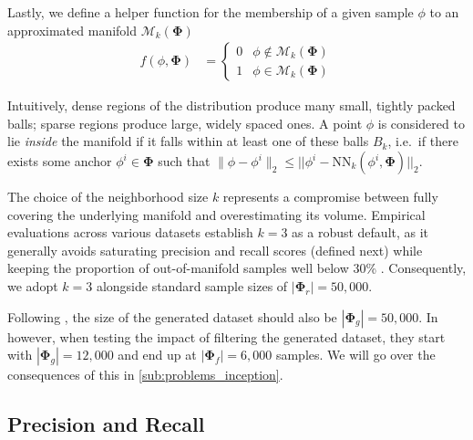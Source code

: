 
Lastly, we define a helper function for the membership of a given sample $\phi$ to an approximated manifold $\mathcal{M}_k(\boldsymbol{\Phi})$
\begin{align}
f(\phi, \boldsymbol{\Phi}) &= 
    \begin{cases} 
      0 & \phi \not \in \mathcal{M}_k(\boldsymbol{\Phi})\\
      1 & \phi \in \mathcal{M}_k(\boldsymbol{\Phi})
\end{cases}
\label{eq:f_helper_func_mk}
\end{align}

\begin{tcolorbox}[colback=gray!10!white,colframe=gray!50!black,sharp corners]
Intuitively, dense regions of the distribution produce many small, tightly packed balls;
sparse regions produce large, widely spaced ones.
A point $\phi$ is considered to lie \emph{inside} the manifold if it
falls within at least one of these balls $B_k$, i.e.\ if there exists some anchor
$\phi^i \in \boldsymbol{\Phi}$ such that $\|\phi - \phi^i\|_2 \le ||\phi^i - \mathrm{NN}_k(\phi^i, \boldsymbol{\Phi})||_2$.
\end{tcolorbox}


The choice of the neighborhood size $k$ represents a compromise between fully covering the underlying manifold and overestimating its volume. Empirical evaluations across various datasets establish $k=3$ as a robust default, as it generally avoids saturating precision and recall scores (defined next) while keeping the proportion of out-of-manifold samples well below 30\% \cite{kynkaanniemi_improved_2019,han_rarity_2022}. Consequently, we adopt $k=3$ alongside standard sample sizes of $|\boldsymbol{\Phi}_r| = 50{,}000$. 

\begin{tcolorbox}[colback=orange!10!white,colframe=orange!50!black,sharp corners]
Following \cite{kynkaanniemi_improved_2019}, the size of the generated dataset should also be $|\boldsymbol{\Phi}_g|= 50{,}000$. In \cite{jazbec_generative_2025} however, when testing the impact of filtering the generated dataset, they start with $|\boldsymbol{\Phi}_g| = 12{,}000$ and end up at $|\boldsymbol{\Phi}_f| = 6{,}000$ samples. We will go over the consequences of this in \autoref{sub:problems_inception}.
\end{tcolorbox}

\subsection{Precision and Recall}
\label{subsec:precision-recall}

